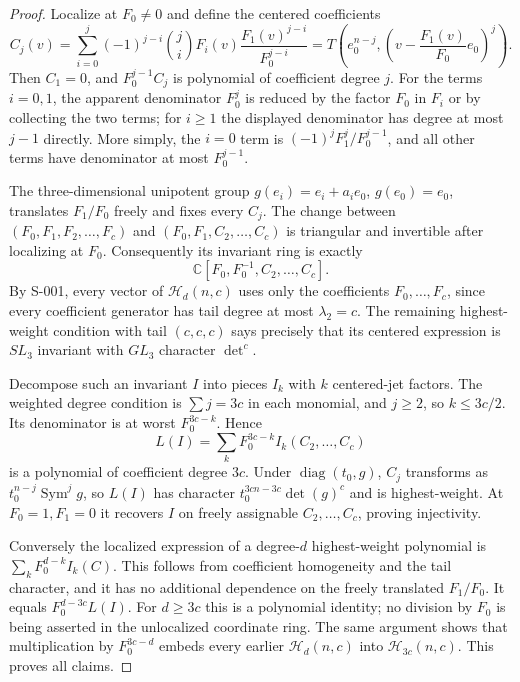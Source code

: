 \begin{proof}
Localize at $F_0\ne0$ and define the centered coefficients
\[
 C_j(v)=\sum_{i=0}^j(-1)^{j-i}\binom ji
               F_i(v)\frac{F_1(v)^{j-i}}{F_0^{j-i}}
       =T\left(e_0^{n-j},
          \left(v-\frac{F_1(v)}{F_0}e_0\right)^j\right).
\]
Then $C_1=0$, and $F_0^{j-1}C_j$ is polynomial of coefficient degree $j$.
For the terms $i=0,1$, the apparent denominator $F_0^j$ is reduced by
the factor $F_0$ in $F_i$ or by collecting the two terms; for $i\geq1$
the displayed denominator has degree at most $j-1$ directly.
More simply, the $i=0$ term is $(-1)^jF_1^j/F_0^{j-1}$, and all other
terms have denominator at most $F_0^{j-1}$.

The three-dimensional unipotent group $g(e_i)=e_i+a_ie_0$, $g(e_0)=e_0$,
translates $F_1/F_0$ freely and fixes every $C_j$. The change between
$(F_0,F_1,F_2,\ldots,F_c)$ and
$(F_0,F_1,C_2,\ldots,C_c)$ is triangular and invertible after localizing
at $F_0$. Consequently its invariant ring is exactly
\[
             \mathbb C[F_0,F_0^{-1},C_2,\ldots,C_c].
\]
By S-001, every vector of $\mathcal H_d(n,c)$ uses only the coefficients
$F_0,\ldots,F_c$, since every coefficient generator has tail degree at
most $\lambda_2=c$. The remaining highest-weight condition with tail
$(c,c,c)$ says precisely that its centered expression is $SL_3$ invariant
with $GL_3$ character $\det^c$.

Decompose such an invariant $I$ into pieces $I_k$ with $k$ centered-jet
factors. The weighted degree condition is $\sum j=3c$ in each monomial,
and $j\geq2$, so $k\leq3c/2$. Its denominator is at worst
$F_0^{3c-k}$. Hence
\[
                  L(I)=\sum_kF_0^{3c-k}I_k(C_2,\ldots,C_c)
\]
is a polynomial of coefficient degree $3c$. Under
$\operatorname{diag}(t_0,g)$, $C_j$ transforms as
$t_0^{n-j}\operatorname{Sym}^j g$, so $L(I)$ has character
$t_0^{3cn-3c}\det(g)^c$ and is highest-weight. At $F_0=1,F_1=0$ it
recovers $I$ on freely assignable $C_2,\ldots,C_c$, proving injectivity.

Conversely the localized expression of a degree-$d$ highest-weight
polynomial is $\sum_kF_0^{d-k}I_k(C)$. This follows from coefficient
homogeneity and the tail character, and it has no additional dependence
on the freely translated $F_1/F_0$. It equals $F_0^{d-3c}L(I)$.
For $d\geq3c$ this is a polynomial identity; no division by $F_0$ is
being asserted in the unlocalized coordinate ring. The same argument
shows that multiplication by $F_0^{3c-d}$ embeds every earlier
$\mathcal H_d(n,c)$ into $\mathcal H_{3c}(n,c)$. This proves all claims.
\end{proof}

